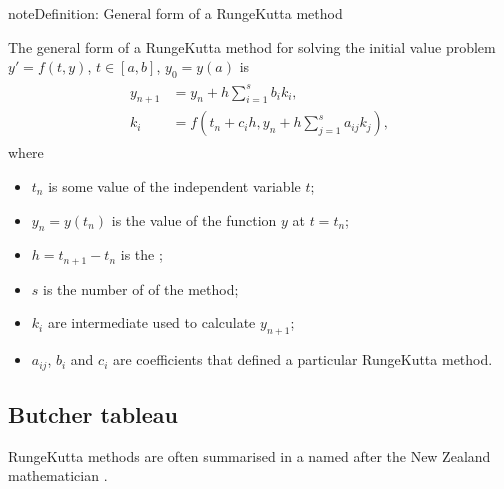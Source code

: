\documentclass[letterpaper,10pt,english]{jupyterBook}
\begin{document}
\begin{sphinxadmonition}{note}{Definition: General form of a Runge\sphinxhyphen{}Kutta method}

\sphinxAtStartPar
The general form of a Runge\sphinxhyphen{}Kutta method for solving the initial value problem \(y' =f(t,y)\), \(t \in [a, b]\), \(y_0 = y(a)\) is
\begin{equation}\label{equation:2_ERKs/2.0_ERKs:rk-equation}
\begin{split}\begin{align}
    y_{n+1} &=y_n +h\sum_{i=1}^s b_i k_i,\\
    k_i &=f(t_n +c_i h,y_n +h\sum_{j=1}^s a_{ij} k_j ),
\end{align}\end{split}
\end{equation}
\sphinxAtStartPar
where
\begin{itemize}
\item {} 
\sphinxAtStartPar
\(t_n\) is some value of the independent variable \(t\);

\item {} 
\sphinxAtStartPar
\(y_n=y(t_n)\) is the value of the function \(y\) at \(t=t_n\);

\item {} 
\sphinxAtStartPar
\(h=t_{n+1}-t_n\) is the ;

\item {} 
\sphinxAtStartPar
\(s\) is the number of  of the method;

\item {} 
\sphinxAtStartPar
\(k_i\) are intermediate  used to calculate \(y_{n+1}\);

\item {} 
\sphinxAtStartPar
\(a_{ij}\), \(b_i\) and \(c_i\) are coefficients that defined a particular Runge\sphinxhyphen{}Kutta method.

\end{itemize}
\end{sphinxadmonition}


\subsection{Butcher tableau}
\label{\detokenize{2_ERKs/2.0_ERKs:butcher-tableau}}\label{\detokenize{2_ERKs/2.0_ERKs:butcher-tableau-section}}
\sphinxAtStartPar
Runge\sphinxhyphen{}Kutta methods are often summarised in a  named after the New Zealand mathematician .
\end{document}
